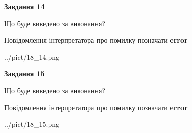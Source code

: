 \documentclass[11pt, ukrainian]{article}
\begin{document}
{\begin {large}
{\begin {center}\textbf{Завдання 14}\end {center}}\par
Що буде виведено за виконання? \par
Повідомлення інтерпретатора про помилку позначати \textbf{error}

\begin{center}
	{../pict/18_14.png}
\end{center}
\newpage

{\begin {center}\textbf{Завдання 15}\end {center}}\par
Що буде виведено за виконання? \par
Повідомлення інтерпретатора про помилку позначати \textbf{error}

\begin{center}
	{../pict/18_15.png}
\end{center}
\newpage

\end {large}}
\end{document}
